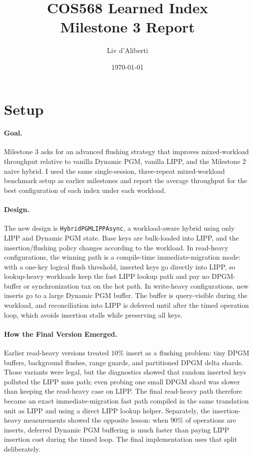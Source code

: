 \documentclass[10pt]{article}
\title{COS568 Learned Index\\Milestone 3 Report}
\author{Liv d'Aliberti}
\date{\today}
\begin{document}
\maketitle
\thispagestyle{empty}

\section*{Setup}

\paragraph{Goal.}
Milestone 3 asks for an advanced flushing strategy that improves mixed-workload throughput relative to vanilla Dynamic PGM, vanilla LIPP, and the Milestone 2 naive hybrid. I used the same single-session, three-repeat mixed-workload benchmark setup as earlier milestones and report the average throughput for the best configuration of each index under each workload.

\paragraph{Design.}
The new design is \texttt{HybridPGMLIPPAsync}, a workload-aware hybrid using only LIPP and Dynamic PGM state. Base keys are bulk-loaded into LIPP, and the insertion/flushing policy changes according to the workload. In read-heavy configurations, the winning path is a compile-time immediate-migration mode: with a one-key logical flush threshold, inserted keys go directly into LIPP, so lookup-heavy workloads keep the fast LIPP lookup path and pay no DPGM-buffer or synchronization tax on the hot path. In write-heavy configurations, new inserts go to a large Dynamic PGM buffer. The buffer is query-visible during the workload, and reconciliation into LIPP is deferred until after the timed operation loop, which avoids insertion stalls while preserving all keys.

\paragraph{How the Final Version Emerged.}
Earlier read-heavy versions treated \(10\%\) insert as a flushing problem: tiny DPGM buffers, background flushes, range guards, and partitioned DPGM delta shards. Those variants were legal, but the diagnostics showed that random inserted keys polluted the LIPP miss path; even probing one small DPGM shard was slower than keeping the read-heavy case on LIPP. The final read-heavy path therefore became an exact immediate-migration fast path compiled in the same translation unit as LIPP and using a direct LIPP lookup helper. Separately, the insertion-heavy measurements showed the opposite lesson: when \(90\%\) of operations are inserts, deferred Dynamic PGM buffering is much faster than paying LIPP insertion cost during the timed loop. The final implementation uses that split deliberately.
\end{document}
